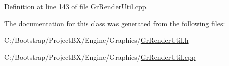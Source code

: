 Definition at line 143 of file GrRenderUtil.cpp.

The documentation for this class was generated from the following files:\begin{CompactItemize}
\item 
C:/Bootstrap/ProjectBX/Engine/Graphics/\hyperlink{_gr_render_util_8h}{GrRenderUtil.h}\item 
C:/Bootstrap/ProjectBX/Engine/Graphics/\hyperlink{_gr_render_util_8cpp}{GrRenderUtil.cpp}\end{CompactItemize}
